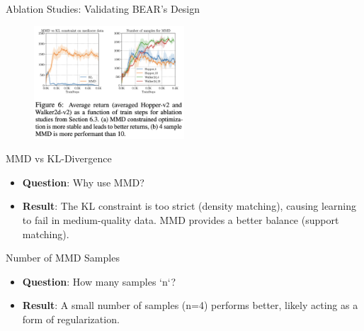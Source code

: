 \documentclass[11pt]{beamer}
\newcommand{\tb}[1]{\textbf{#1}}
\begin{document}
\begin{frame}{Ablation Studies: Validating BEAR's Design}
    \begin{figure}
     \includegraphics[width=0.5\textwidth]{Figure6.png}
    \end{figure}
    \begin{block}{MMD vs KL-Divergence}
            \begin{itemize}
                \item \tb{Question}: Why use MMD?
                \item \tb{Result}: The KL constraint is too strict (density matching), causing learning to fail in medium-quality data. MMD provides a better balance (support matching).
            \end{itemize}
    \end{block}

    \begin{block}{Number of MMD Samples}
        \begin{itemize}
            \item \tb{Question}: How many samples `n`?
            \item \tb{Result}: A small number of samples (n=4) performs better, likely acting as a form of regularization.
        \end{itemize}
    \end{block}
\end{frame}
\end{document}
